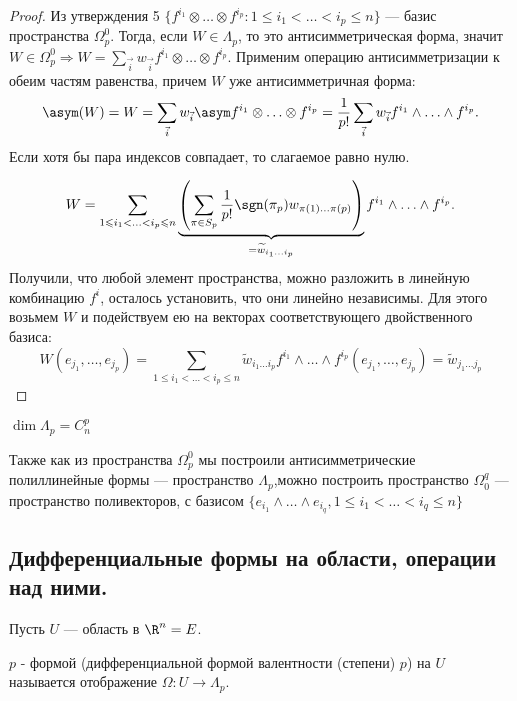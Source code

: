 \begin{proof}
	Из утверждения 5 $\{f^{i_1}\otimes\ldots\otimes     f^{i_p}:1\leqslant i_1<\ldots<i_p\leqslant n\}$ --- базис пространства $\Omega_p^0$. Тогда, если $W\in \Lambda_p$, то это антисимметрическая форма, значит \\$W\in \Omega_p^0\Rightarrow W=\sum\limits_{\vec{i}}w_{\vec{i}}f^{i_1}\otimes\ldots\otimes f^{i_p}$. Применим операцию антисимметризации к обеим частям равенства, причем $W$ уже антисимметричная форма:
	$$\asym(W)=W=\sum\limits_{\vec{i}}w_{\vec{i}}\asym f^{i_1}\otimes\ldots\otimes f^{i_p}= \dfrac{1}{p!}\sum\limits_{\vec{i}}w_{\vec{i}}f^{i_1}\wedge\ldots\wedge f^{i_p}.$$
	Если хотя бы пара индексов совпадает, то слагаемое равно нулю. 
	
	$$W = \sum\limits_{1\leqslant i_1 < \ldots < i_p \leqslant n}\underbrace{\left(\sum\limits_{\pi\in S_p}\dfrac{1}{p!}\sgn(\pi_p)w_{\pi(1)\ldots\pi(p)}\right)}_{=\widetilde{w}_{i_1 \ldots i_p}}f^{i_1}\wedge\ldots\wedge f^{i_p}.$$
	Получили, что любой элемент пространства, можно разложить в линейную комбинацию $f^i$, осталось установить, что они линейно независимы.
	 Для этого возьмем $W$ и подействуем ею на векторах соответствующего двойственного базиса: 
	 $$W(e_{j_1}, \ldots, e_{j_p})=\sum\limits_{1\leqslant i_1 < \ldots < i_p \leqslant n}\widetilde{w}_{i_1 \ldots i_p}f^{i_1}\wedge\ldots\wedge f^{i_p}(e_{j_1},\ldots, e_{j_p})=\widetilde{w}_{j_1 \ldots j_p}$$
\end{proof}

\begin{corollary}
	$\dim\Lambda_p=C_n^p$
\end{corollary}

\begin{note}
	Также как из пространства $\Omega_p^0$ мы построили антисимметрические полиллинейные формы --- пространство $\Lambda_p$,можно построить пространство $\Omega_0^q$ --- пространство поливекторов, с базисом $\{e_{i_1}\wedge\ldots\wedge e_{i_q}, 1\leqslant i_1 < \ldots < i_q\leqslant n\}$
\end{note}


\subsection{Дифференциальные формы на области, операции над ними.}

Пусть $U$ --- область в $\R^n=E$.

\begin{Def}
	$p$ - формой (дифференциальной формой валентности (степени) $p$) на $U$ называется отображение $\Omega: U\to \Lambda_p$.
\end{Def}

